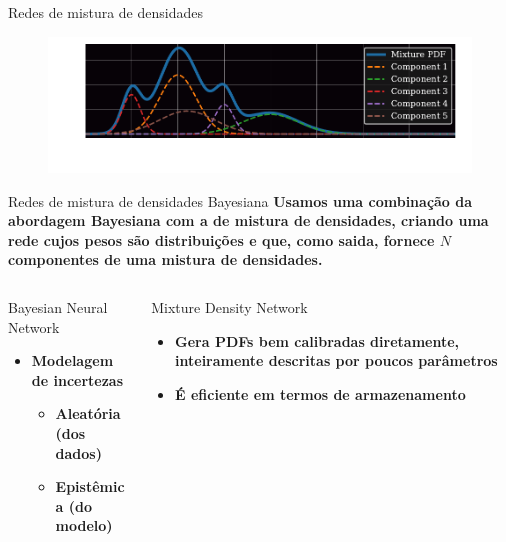 \begin{frame}[c]{Redes de mistura de densidades}
    \begin{figure}
        \centering
        \includegraphics[width=\linewidth]{script/images/mixture_pdf_5comp.pdf}
    \end{figure}
\end{frame}

\begin{frame}[c]{Redes de mistura de densidades Bayesiana}
    \textbf{Usamos uma combinação da abordagem Bayesiana com a de mistura de densidades, criando uma rede cujos pesos são distribuições e que, como saida, fornece $N$ componentes de uma mistura de densidades.}

    \begin{columns}[c]
        \begin{column}{0.46\textwidth}
            \begin{splusbox}{Bayesian Neural Network}
                \begin{itemize}
                    \item \textbf{Modelagem de incertezas}
                    \begin{itemize}
                        \item \textbf{Aleatória (dos dados)}
                        \item \textbf{Epistêmica (do modelo)}
                    \end{itemize}
                \end{itemize}
            \end{splusbox}
        \end{column}
        \begin{column}{0.46\textwidth}
            \begin{splusbox}{Mixture Density Network}
                \begin{itemize}
                    \item \textbf{Gera PDFs bem calibradas diretamente, inteiramente descritas por poucos parâmetros}
                    \item \textbf{É eficiente em termos de armazenamento}
                \end{itemize}
            \end{splusbox}
        \end{column}
    \end{columns}


\end{frame}
